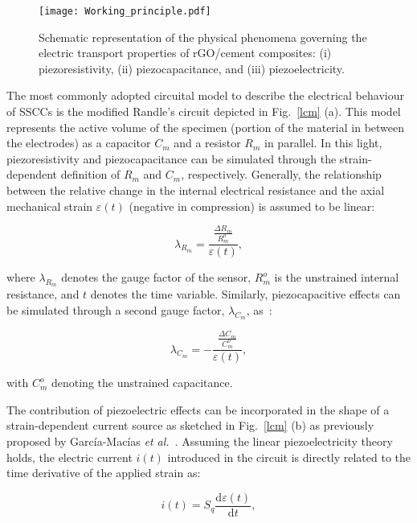 \documentclass[a4paper,fleqn]{cas-sc}
\begin{document}
\begin{figure}[ht]
\centering
\texttt{[image: Working\_principle.pdf]}
\caption{Schematic representation of the physical phenomena governing the electric transport properties of rGO/cement composites: (i) piezoresistivity, (ii) piezocapacitance, and (iii) piezoelectricity.}
\label{wp}
\end{figure}

The most commonly adopted circuital model to describe the electrical behaviour of SSCCs is the modified Randle's circuit depicted in Fig.~\ref{lcm} (a). This model represents the active volume of the specimen (portion of the material in between the electrodes) as a capacitor $C_{m}$ and a resistor $R_{m}$ in parallel. In this light, piezoresistivity and piezocapacitance can be simulated through the strain-dependent definition of $R_{m}$ and $C_{m}$, respectively. Generally, the relationship between the relative change in the internal electrical resistance and the axial mechanical strain $\varepsilon(t)$ (negative in compression) is assumed to be linear:

\begin{equation}
\lambda_{R_m} = \frac{\frac{\Delta R_{m}}{R_{m}^o}}{\varepsilon(t)},
\label{eq:FCR}
\end{equation}

\noindent where $\lambda_{R_m}$ denotes the gauge factor of the sensor, $R_{m}^o$ is the unstrained internal resistance, and $t$ denotes the time variable. Similarly, piezocapacitive effects can be simulated through a second gauge factor, $\lambda_{C_m}$, as~\cite{Sanli2016}:

\begin{equation}
\lambda_{C_m} = -\frac{\frac{\Delta C_{m}}{C_{m}^o}}{\varepsilon(t)},
\label{eq:FCC}
\end{equation}

\noindent with $C_{m}^o$ denoting the unstrained capacitance. 

The contribution of piezoelectric effects can be incorporated in the shape of a strain-dependent current source as sketched in Fig.~\ref{lcm} (b) as previously proposed by Garc\'{i}a-Mac\'{i}as \textsl{et al.}~\cite{garcia2017enhanced}. Assuming the linear piezoelectricity theory holds, the electric current $i(t)$ introduced in the circuit is directly related to the time derivative of the applied strain as:

\begin{equation}\label{piezoelec1}
i(t)=S_q\frac{\textrm{d}\varepsilon(t)}{\textrm{d}t},
\end{equation}
\end{document}
